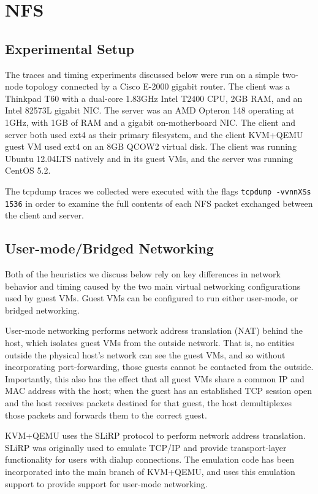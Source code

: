 \documentclass[11pt,pdftex,twocolumn]{article}
\begin{document}
\section{NFS}

\subsection{Experimental Setup}
\label{subsec:expSetup}
The traces and timing experiments discussed below were run on a simple two-node topology connected by a Cisco E-2000 gigabit router. The client was a Thinkpad T60 with a dual-core 1.83GHz Intel T2400 CPU, 2GB RAM, and an Intel 82573L gigabit NIC. The server was an AMD Opteron 148 operating at 1GHz, with 1GB of RAM and a gigabit on-motherboard NIC. The client and server both used ext4 as their primary filesystem, and the client KVM+QEMU guest VM used ext4 on an 8GB QCOW2 virtual disk. The client was running Ubuntu 12.04LTS natively and in its guest VMs, and the server was running CentOS 5.2.

The tcpdump traces we collected were executed with the flags \texttt{tcpdump -vvnnXSs 1536} in order to examine the full contents of each NFS packet exchanged between the client and server.

\subsection{User-mode/Bridged Networking}
\label{subsec:networkIntro}
Both of the heuristics we discuss below rely on key differences in network behavior and timing caused by the two main virtual networking configurations used by guest VMs. Guest VMs can be configured to run either user-mode, or bridged networking.

User-mode networking performs network address translation (NAT) behind the host, which isolates guest VMs from the outside network. That is, no entities outside the physical host's network can see the guest VMs, and so without incorporating port-forwarding, those guests cannot be contacted from the outside. Importantly, this also has the effect that all guest VMs share a common IP and MAC address with the host; when the guest has an established TCP session open and the host receives packets destined for that guest, the host demultiplexes those packets and forwards them to the correct guest. 

KVM+QEMU uses the SLiRP protocol to perform network address translation. SLiRP was originally used to emulate TCP/IP and provide transport-layer functionality for users with dialup connections. The emulation code has been incorporated into the main branch of KVM+QEMU, and uses this emulation support to provide support for user-mode networking.
\end{document}
